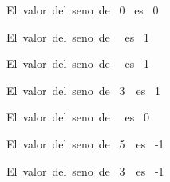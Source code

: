 \begin{maximaop}
\mbox{ El valor del seno de  }
0
\mbox{  es  }
0
\end{maximaop}
\begin{maximaop}
\mbox{ El valor del seno de  }
{{\pi}}
\mbox{  es  }
{{1}}
\end{maximaop}
\begin{maximaop}
\mbox{ El valor del seno de  }
{{\pi}}
\mbox{  es  }
1
\end{maximaop}
\begin{maximaop}
\mbox{ El valor del seno de  }
{{3\,\pi}}
\mbox{  es  }
{{1}}
\end{maximaop}
\begin{maximaop}
\mbox{ El valor del seno de  }
\pi
\mbox{  es  }
0
\end{maximaop}
\begin{maximaop}
\mbox{ El valor del seno de  }
{{5\,\pi}}
\mbox{  es  }
-{{1}}
\end{maximaop}
\begin{maximaop}
\mbox{ El valor del seno de  }
{{3\,\pi}}
\mbox{  es  }
-1
\end{maximaop}
